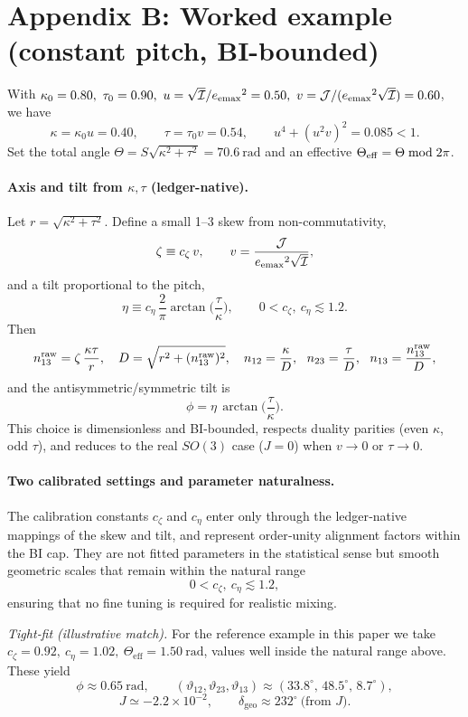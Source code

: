 \documentclass[coverpage]{qadi-article}
\begin{document}
\section*{Appendix B: Worked example (constant pitch, BI-bounded)}
With \(\kappa_0=0.80,\ \tau_0=0.90,\ u=\sqrt{\mathcal I}/\eemaxsq=0.50,\ v=\mathcal J/(\eemaxsq\sqrt{\mathcal I})=0.60\), we have
\[
\kappa=\kappa_0 u=0.40,\qquad \tau=\tau_0 v=0.54,\qquad
u^4+(u^2v)^2=0.085<1.
\]
Set the total angle \(\Theta=S\sqrt{\kappa^2+\tau^2}=70.6~\text{rad}\) and an effective \(\Theta_{\rm eff}=\Theta\bmod 2\pi\).

\paragraph{Axis and tilt from \(\kappa,\tau\) (ledger-native).}
Let \(r=\sqrt{\kappa^2+\tau^2}\). Define a small 1--3 skew from non-commutativity,
\[
\zeta \equiv c_\zeta\,v,\qquad v=\frac{\mathcal J}{{e_{\mathrm{emax}}}^{2}\sqrt{\mathcal I}},
\]
and a tilt proportional to the pitch,
\[
\eta \equiv c_\eta\,\frac{2}{\pi}\arctan\!\Big(\frac{\tau}{\kappa}\Big),\qquad 0<c_\zeta,\ c_\eta\lesssim 1.2.
\]
Then
\[
n_{13}^{\rm raw}=\zeta\,\frac{\kappa\tau}{r},\quad
D=\sqrt{r^{2}+(n_{13}^{\rm raw})^{2}},\quad
n_{12}=\frac{\kappa}{D},\ \ n_{23}=\frac{\tau}{D},\ \ n_{13}=\frac{n_{13}^{\rm raw}}{D},
\]
and the antisymmetric/symmetric tilt is
\[
\phi=\eta\,\arctan\!\Big(\frac{\tau}{\kappa}\Big).
\]
This choice is dimensionless and BI-bounded, respects duality parities (even \(\kappa\), odd \(\tau\)), and reduces to the real \(SO(3)\) case (\(J=0\)) when \(v\to 0\) or \(\tau\to 0\).

\paragraph{Two calibrated settings and parameter naturalness.}
The calibration constants \(c_\zeta\) and \(c_\eta\) enter only through the
ledger‐native mappings of the skew and tilt, and represent order‐unity
alignment factors within the BI cap.
They are not fitted parameters in the statistical sense but smooth geometric
scales that remain within the natural range
\[
0 < c_\zeta,\ c_\eta \lesssim 1.2,
\]
ensuring that no fine tuning is required for realistic mixing.

\textit{Tight‐fit (illustrative match).}
For the reference example in this paper we take
\(c_\zeta = 0.92,\ c_\eta = 1.02,\ \Theta_{\mathrm{eff}} = 1.50~\mathrm{rad}\),
values well inside the natural range above.
These yield
\[
\phi \approx 0.65~\mathrm{rad},\qquad
(\vartheta_{12},\vartheta_{23},\vartheta_{13})
  \approx (33.8^\circ,\,48.5^\circ,\,8.7^\circ),
\]
\[
J \simeq -2.2\times10^{-2},\qquad
\delta_{\mathrm{geo}} \approx 232^\circ\ \text{(from }J\text{)}.
\]
\end{document}

